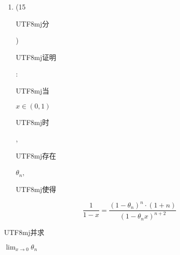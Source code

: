 \documentclass[10pt]{article}
\begin{document}
\begin{enumerate}
  \item (15 \begin{CJK}{UTF8}{mj}分\end{CJK}) \begin{CJK}{UTF8}{mj}证明\end{CJK}: \begin{CJK}{UTF8}{mj}当\end{CJK} $x \in(0,1)$ \begin{CJK}{UTF8}{mj}时\end{CJK}, \begin{CJK}{UTF8}{mj}存在\end{CJK} $\theta_{n}$, \begin{CJK}{UTF8}{mj}使得\end{CJK}

\end{enumerate}
$$
\frac{1}{1-x}=\frac{\left(1-\theta_{n}\right)^{n} \cdot(1+n)}{\left(1-\theta_{n} x\right)^{n+2}}
$$
\begin{CJK}{UTF8}{mj}并求\end{CJK} $\lim _{x \rightarrow 0} \theta_{n}$
\end{document}

